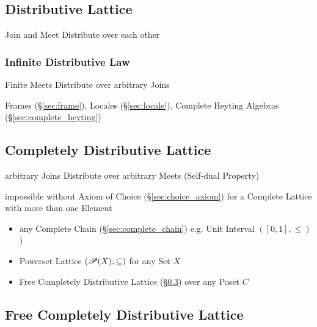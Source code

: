\subsection{Distributive Lattice}\label{sec:distributive_lattice}

Join and Meet Distribute over each other



\subsubsection{Infinite Distributive Law}
\label{sec:infinite_distributive}

Finite Meets Distribute over arbitrary Joins

Frames (\S\ref{sec:frame}), Locales (\S\ref{sec:locale}), Complete
Heyting Algebras (\S\ref{sec:complete_heyting})



\subsection{Completely Distributive Lattice}
\label{sec:completely_distributive}

arbitrary Joins Distribute over arbitrary Meets (Self-dual Property)

impossible without Axiom of Choice (\S\ref{sec:choice_axiom}) for a
Complete Lattice with more than one Element

\begin{itemize}
  \item any Complete Chain (\S\ref{sec:complete_chain}) e.g. Unit
    Interval $([0,1], \leq)$)
  \item Powerset Lattice $(\mathscr{P}(X), \subseteq)$ for any Set
    $X$
  \item Free Completely Distributive Lattice
    (\S\ref{sec:free_completely_distributive_lattice}) over any Poset
    $C$
\end{itemize}



\subsection{Free Completely Distributive Lattice}
\label{sec:free_completely_distributive_lattice}

